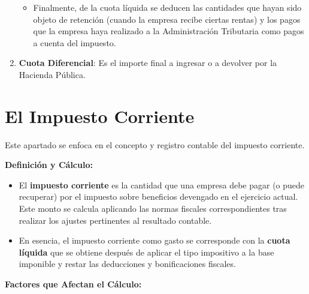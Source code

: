 \documentclass[
  paper=a4,
  ,captions=tableheading
]{scrbook}
\providecommand{\tightlist}{%
  \setlength{\itemsep}{0pt}\setlength{\parskip}{0pt}}
\begin{document}
\begin{enumerate}
  \begin{itemize}
  \tightlist
  \item
    Finalmente, de la cuota líquida se deducen las cantidades que hayan
    sido objeto de retención (cuando la empresa recibe ciertas rentas) y
    los pagos que la empresa haya realizado a la Administración
    Tributaria como pagos a cuenta del impuesto.
  \end{itemize}
\item
  \textbf{Cuota Diferencial}: Es el importe final a ingresar o a
  devolver por la Hacienda Pública.
\end{enumerate}

\hypertarget{el-impuesto-corriente}{%
\section{El Impuesto Corriente}\label{el-impuesto-corriente}}

Este apartado se enfoca en el concepto y registro contable del impuesto
corriente.

\textbf{Definición y Cálculo:}

\begin{itemize}
\tightlist
\item
  El \textbf{impuesto corriente} es la cantidad que una empresa debe
  pagar (o puede recuperar) por el impuesto sobre beneficios devengado
  en el ejercicio actual. Este monto se calcula aplicando las normas
  fiscales correspondientes tras realizar los ajustes pertinentes al
  resultado contable.
\item
  En esencia, el impuesto corriente como gasto se corresponde con la
  \textbf{cuota líquida} que se obtiene después de aplicar el tipo
  impositivo a la base imponible y restar las deducciones y
  bonificaciones fiscales.
\end{itemize}

\textbf{Factores que Afectan el Cálculo:}
\end{document}
